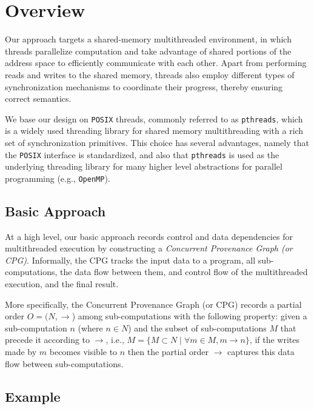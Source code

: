 \section{Overview}
\label{sec:overview}

Our approach targets a shared-memory multithreaded environment, in which threads parallelize computation and take 
advantage of shared portions of the address space to efficiently communicate with each other. Apart from performing reads 
and writes to the shared memory, threads also employ different types of synchronization mechanisms to 
coordinate their progress, thereby ensuring correct semantics. 

We base our design on {\tt POSIX} threads, commonly referred to as
{\tt pthreads}, which is a widely used threading library for shared memory
multithreading with a rich set of synchronization primitives.  This
choice has several advantages, namely that the {\tt POSIX} interface
is standardized, and also that {\tt pthreads} is used as the underlying threading
library for many higher level abstractions for parallel programming
(e.g., {\tt OpenMP}).


\subsection{Basic Approach}

At a high level, our basic approach records control and data dependencies for multithreaded execution by constructing a {\em Concurrent Provenance Graph (or CPG)}. Informally, the CPG tracks the input data to a program, all sub-computations, the data flow between them, and control flow of the multithreaded execution, and the final result. 

More specifically, the Concurrent Provenance Graph (or CPG) records a partial order $O = (N, \rightarrow$) among sub-computations with the following property: given a sub-computation $n$ (where $n \in N $)  and the subset of sub-computations $M$ that precede it according to $\rightarrow$, i.e., $M = \{M \subset N \mid \forall m \in M, m \rightarrow n\}$, if the writes made by $m$ becomes visible to $n$ then the partial order $\rightarrow$ captures this data flow between sub-computations.




\subsection{Example}

